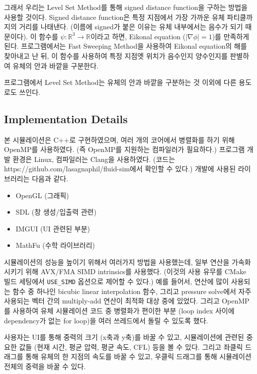 \documentclass[10pt, A4]{article}
\begin{document}
그래서 우리는 Level Set Method를 통해 signed distance function을 구하는 방법을 사용할 것이다. Signed distance function은 특정 지점에서 가장 가까운 유체 파티클까지의 거리를 나태낸다. (이름에 signed가 붙은 이유는 유체 내부에서는 음수가 되기 때문이다). 이 함수를 $\psi: \mathbb{R}^3 \rightarrow \mathbb{R}$이라고 하면, Eikonal equation ($|\nabla \phi| = 1$)를 만족하게 된다. 프로그램에서는 Fast Sweeping Method\cite{fast-sweeping}을 사용하여 Eikonal equation의 해를 찾아내고 난 뒤, 이 함수를 사용하여 특정 지점엣 위치가 음수인지 양수인지를 판별하여 유체의 안과 바깥을 구분한다.

프로그램에서 Level Set Method는 유체의 안과 바깥을 구분하는 것 이외에 다른 용도로도 쓰인다. 

\subsection{Implementation Details}

본 시뮬레이션은 C++로 구현하였으며, 여러 개의 코어에서 병렬화를 하기 위해 OpenMP를 사용하였다. (즉 OpenMP를 지원하는 컴파일러가 필요하다.) 프로그램 개발 환경은 Linux, 컴파일러는 Clang을 사용하였다. (코드는 https://github.com/lasagnaphil/fluid-sim에서 확인할 수 있다.) 개발에 사용된 라이브러리는 다음과 같다.

\begin{itemize}
  \item OpenGL (그래픽)
  \item SDL (창 생성/입출력 관련)
  \item IMGUI (UI 관련된 부분)
  \item MathFu (수학 라이브러리)
\end{itemize}

시뮬레이션의 성능을 높이기 위해서 여러가지 방법을 사용했는데, 일부 연산을 가속화시키기 위해 AVX/FMA SIMD intrinsics를 사용했다. (이것의 사용 유무를 CMake 빌드 세팅에서 \texttt{USE\_SIMD} 옵션으로 제어할 수 있다.) 예를 들어서, 연산에 많이 사용되는 함수 중 하나인 bicubic linear interpolation 함수, 그리고 pressure solve에서 자주 사용되는 벡터 간의 multiply-add 연산이 최적화 대상 중에 있었다.  그리고 OpenMP를 사용하여 유체 시뮬레이션 코드 중 병렬화가 편이한 부분 (loop index 사이에 dependency가 없는 for loop)을 여러 쓰레드에서 돌릴 수 있도록 했다.

사용자는 UI를 통해 중력의 크기 (x축과 y축)를 바꿀 수 있고, 시뮬레이션에 관련된 중요한 값들 (현재 시간, 평균 압력, 평균 속도, CFL) 등을 볼 수 있다. 그리고 좌클릭 드래그를 통해 유체의 한 지점의 속도를 바꿀 수 있고, 우클릭 드래그를 통해 시뮬레이션 전체의 중력을 바꿀 수 있다.
\end{document}
